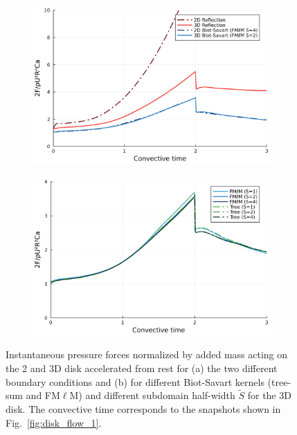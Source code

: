 \documentclass[final,1p,times]{elsarticle}
\begin{document}
\begin{figure}
    \centering
    \begin{subfigure}{.5\textwidth}
        \centering
         \includegraphics[width=\textwidth]{tex//fig/Disk_force_comparison.png}
         \caption{}
    \end{subfigure}%
    \begin{subfigure}{.5\textwidth}
        \centering
        \includegraphics[width=\linewidth]{tex/fig/Disk_force_comparison_methods.png}
        \caption{}
    \end{subfigure}%
    \caption{Instantaneous pressure forces normalized by added mass acting on the 2 and 3D disk accelerated from rest for (a) the two different boundary conditions and (b) for different Biot-Savart kernels (tree-sum and FM$\ell$M) and different subdomain half-width $\tilde S$ for the 3D disk. The convective time corresponds to the snapshots shown in Fig.~\ref{fig:disk_flow_1}.}
    \label{fig:disk_forces}
\end{figure}
\end{document}
